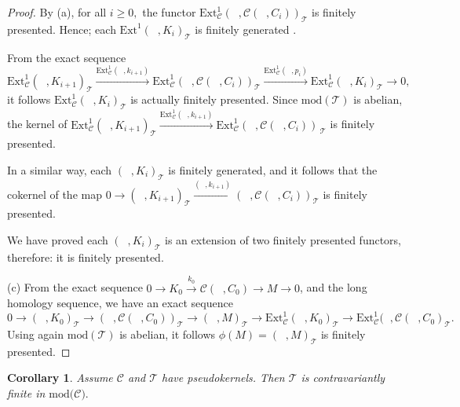 \documentclass{amsart}
\theoremstyle{plain}
\newtheorem{corollary}{Corollary}
\numberwithin{equation}{section}
\begin{document}
\begin{proof}
By (a), for all $i\geq 0,$ the functor $\mathrm{Ext}^{1}_{\mathcal{C}}(\;\;,\mathcal{C}(\;\;,C_{i}))_{\mathcal{T}}$ is finitely presented. Hence; each $\mathrm{Ext}^{1}(\;\;,K_{i})_{\mathcal{T}}$ is finitely generated .

From the exact sequence
\begin{equation*}
\mathrm{Ext}_{\mathcal{C}}^{1}(\;\;,K_{i+1})_{\mathcal{T}}\xrightarrow{\mathrm{Ext}^1_{\mathcal{C}}(\;\;,k_{i+1})}\mathrm{Ext}^{1}_{\mathcal{C}}(\;\;,\mathcal{C}(\;\;,C_{i}))_{\mathcal{T}}\xrightarrow{\mathrm{Ext}^1_{\mathcal{C}}(\;\;,p_{i})}\mathrm{Ext}^{1}_{\mathcal{C}}(\;\;,K_{i})_{\mathcal{T}}\rightarrow 0\text{,}
\end{equation*}
it follows $\mathrm{Ext}^{1}_{\mathcal{C}}(\;\;,K_{i})_{\mathcal{T}}$ is
actually finitely presented. Since $\mathrm{mod}(\mathcal{T})$ is abelian,
the kernel of $\mathrm{Ext}_{\mathcal{C}}^{1}(\;\;,K_{i+1})_\mathcal{T}\xrightarrow{\mathrm{Ext}^1_{\mathcal{C}}(\;\;,k_{i+1})}\mathrm{Ext}^{1}_{\mathcal{C}}(\;\;,\mathcal{C}(\;\;,C_{i}))_\mathcal{\ T} $ is finitely
presented.

In a similar way, each $(\;\;,K_{i})_{\mathcal{T}}$ is finitely generated,
and it follows that the cokernel of the map $0\rightarrow (\;\;,K_{i+1})_\mathcal{T}\xrightarrow{(\;\;,k_{i+1})}(\;\;,\mathcal{C}(\;\;,C_{i}))_\mathcal{T}$ is finitely presented.

We have proved each $(\;\;,K_{i})_{\mathcal{T}}$ is an extension of two
finitely presented functors, therefore: it is finitely presented.

(c) From the exact sequence $0\rightarrow K_{0}\xrightarrow{k_0}\mathcal{C}(\;\;,C_{0})\rightarrow M\rightarrow 0$, and the long homology sequence, we
have an exact sequence
\begin{equation*}
0\rightarrow (\;\;,K_{0})_{\mathcal{T}}\rightarrow (\;\;,\mathcal{C}(\;\;,C_{0}))_{\mathcal{T}}\rightarrow (\;\;,M)_{\mathcal{T}}\rightarrow
\mathrm{Ext}^{1}_{\mathcal{C}}(\;\;,K_{0})_{\mathcal{T}}\rightarrow \mathrm{Ext}^{1}_{\mathcal{C}}(\;\;,\mathcal{C}(\;\;,C_{0})_{\mathcal{T}}\text{.}
\end{equation*}Using again $\mathrm{mod}(\mathcal{T})$ is abelian, it follows $\phi
(M)=(\;\;,M)_{\mathcal{T}}$ is finitely presented.
\end{proof}

\begin{corollary}
Assume $\mathcal{C}$ and $\mathcal{T}$ have pseudokernels. Then $\mathcal{T}$
is contravariantly finite in $\mathrm{mod}(\mathcal{C)}.$
\end{corollary}
\end{document}
